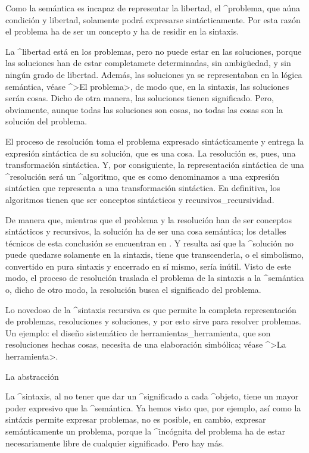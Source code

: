 Como la semántica es incapaz de representar la libertad, el ^{problema},
que aúna condición y libertad, solamente podrá expresarse
sintácticamente. Por esta razón el problema ha de ser un concepto y ha
de residir en la sintaxis.

La ^{libertad} está en los problemas, pero no puede estar en las
soluciones, porque las soluciones han de estar completamete
determinadas, sin ambigüedad, y sin ningún grado de libertad. Además,
las soluciones ya se representaban en la lógica semántica, véase ^>El
problema>, de modo que, en la sintaxis, las soluciones serán cosas.
Dicho de otra manera, las soluciones tienen significado. Pero,
obviamente, aunque todas las soluciones son cosas, no todas las cosas
son la solución del problema.

El proceso de resolución toma el problema expresado sintácticamente y
entrega la expresión sintáctica de su solución, que es una cosa. La
resolución es, pues, una transformación sintáctica. Y, por consiguiente,
la representación sintáctica de una ^{resolución} será un ^{algoritmo},
que es como denominamos a una expresión sintáctica que representa a una
transformación sintáctica. En definitiva, los algoritmos tienen que ser
conceptos sintácticos y recursivos_{recursividad}.

De manera que, mientras que el problema y la resolución han de ser
conceptos sintácticos y recursivos, la solución ha de ser una cosa
semántica; los detalles técnicos de esta conclusión se encuentran en
. Y resulta así que la ^{solución} no puede quedarse solamente
en la sintaxis, tiene que transcenderla, o el simbolismo, convertido en
pura sintaxis y encerrado en sí mismo, sería inútil. Visto de este modo,
el proceso de resolución traslada el problema de la sintaxis a la
^{semántica} o, dicho de otro modo, la resolución busca el significado
del problema.

Lo novedoso de la ^{sintaxis} recursiva es que permite la completa
representación de problemas, resoluciones y soluciones, y por esto sirve
para resolver problemas. Un ejemplo: el diseño sistemático de
herramientas_{herramienta}, que son resoluciones hechas cosas, necesita
de una elaboración simbólica; véase ^>La herramienta>.


\Section La abstracción

La ^{sintaxis}, al no tener que dar un ^{significado} a cada ^{objeto},
tiene un mayor poder expresivo que la ^{semántica}. Ya hemos visto que,
por ejemplo, así como la sintáxis permite expresar problemas, no es
posible, en cambio, expresar semánticamente un problema, porque la
^{incógnita} del problema ha de estar necesariamente libre de cualquier
significado. Pero hay más.

